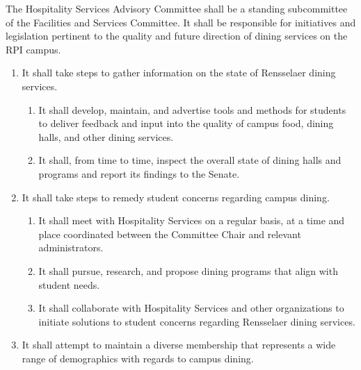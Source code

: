 \item The Hospitality Services Advisory Committee shall be a standing subcommittee of the Facilities and Services Committee. It
shall be responsible for initiatives and legislation pertinent to the quality and future direction of dining services on the RPI
campus.
\begin{enumerate}
    \item It shall take steps to gather information on the state of Rensselaer dining services.
    \begin{enumerate}
        \item It shall develop, maintain, and advertise tools and methods for students to deliver feedback and input into the quality of
        campus food, dining halls, and other dining services.
        \item It shall, from time to time, inspect the overall state of dining halls and programs and report its findings to the Senate.
    \end{enumerate}

    \item It shall take steps to remedy student concerns regarding campus dining.
    \begin{enumerate}
        \item It shall meet with Hospitality Services on a regular basis, at a time and place coordinated between the Committee Chair
        and relevant administrators.
        \item It shall pursue, research, and propose dining programs that align with student needs.
        \item It shall collaborate with Hospitality Services and other organizations to initiate solutions to student concerns regarding
        Rensselaer dining services.
    \end{enumerate}

    \item It shall attempt to maintain a diverse membership that represents a wide range of demographics with regards to campus
    dining.
\end{enumerate}
